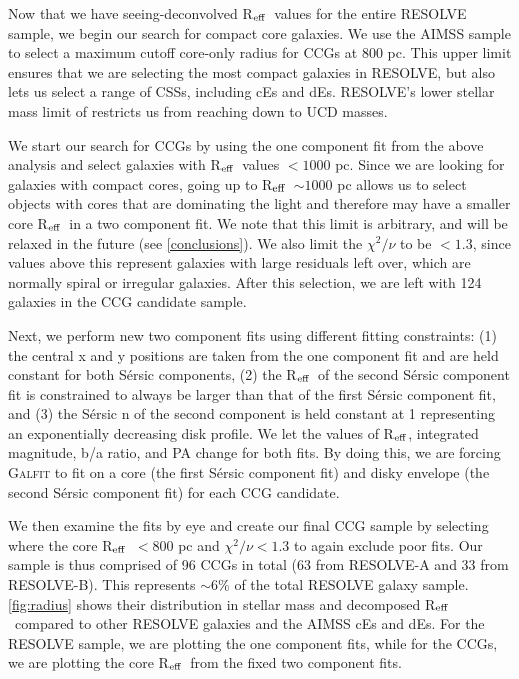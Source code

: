 \documentclass[iop,apj]{emulateapj}
\newcommand{\Reff}{R$_{\rm eff}$}
\begin{document}
\noindent Now that we have seeing-deconvolved \Reff\ values for the entire RESOLVE sample, we begin our search for compact core galaxies. We use the AIMSS sample to select a maximum cutoff core-only radius for CCGs at 800 pc. This upper limit ensures that we are selecting the most compact galaxies in RESOLVE, but also lets us select a range of CSSs, including cEs and dEs. RESOLVE's lower stellar mass limit of  restricts us from reaching down to UCD masses.

We start our search for CCGs by using the one component fit from the above analysis and select galaxies with \Reff\ values $<1000$ pc. Since we are looking for galaxies with compact cores, going up to \Reff\ $\sim 1000$ pc allows us to select objects with cores that are dominating the light and therefore may have a smaller core \Reff\ in a two component fit. We note that this limit is arbitrary, and will be relaxed in the future (see \autoref{conclusions}). We also limit the  $\chi^2/\nu$ to be $<1.3$, since values above this represent galaxies with large residuals left over, which are normally spiral or irregular galaxies. After this selection, we are left with 124 galaxies in the CCG candidate sample.

Next, we perform new two component fits using different fitting constraints: (1) the central x and y positions are taken from the one component fit and are held constant for both S\'ersic components, (2) the \Reff\ of the second S\'ersic component fit is constrained to always be larger than that of the first S\'ersic component fit, and (3) the S\'ersic n of the second component is held constant at 1 representing an exponentially decreasing disk profile. We let the values of \Reff, integrated magnitude, b/a ratio, and PA change for both fits. By doing this, we are forcing \textsc{Galfit} to fit on a core (the first S\'ersic component fit) and disky envelope (the second S\'ersic component fit) for each CCG candidate.

We then examine the fits by eye and create our final CCG sample by selecting where the core \Reff\ $< 800$ pc and $\chi^2/\nu < 1.3$ to again exclude poor fits. Our sample is thus comprised of 96 CCGs in total (63 from RESOLVE-A and 33 from RESOLVE-B). This represents $\sim6$\% of the total RESOLVE galaxy sample. \autoref{fig:radius} shows their distribution in stellar mass and decomposed \Reff\ compared to other RESOLVE galaxies and the AIMSS cEs and dEs. For the RESOLVE sample, we are plotting the one component fits, while for the CCGs, we are plotting the core \Reff\ from the fixed two component fits. 
\end{document}
